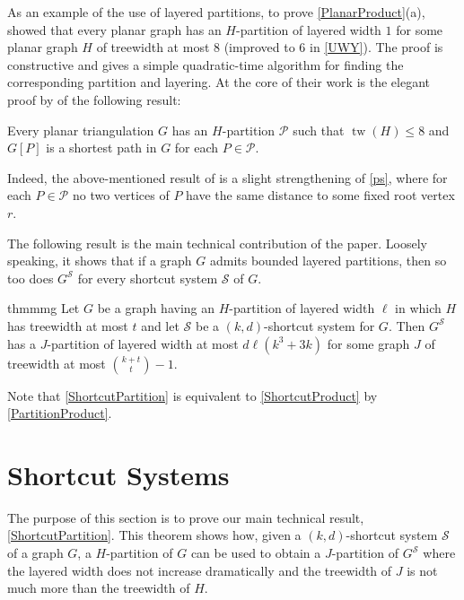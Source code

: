 \documentclass{patmorin}
\DeclareMathOperator{\tw}{tw}
\newcommand{\PP}{\mathcal{P}}
\renewcommand{\SS}{\mathcal{S}}
\renewcommand{\leq}{\leqslant}
\begin{document}
As an example of the use of layered partitions, to prove \cref{PlanarProduct}(a),
\citet{DJMMUW20} showed that every planar graph has an $H$-partition of layered width $1$ for some planar graph $H$ of treewidth at most $8$ (improved to $6$ in \cref{UWY}). The proof is constructive and gives a simple quadratic-time algorithm for finding the corresponding partition and layering. At the core of their work is the elegant proof by \citet{PS21} of the following result:

\begin{thm}[\citep{PS21}]
\label{ps}
Every planar triangulation $G$ has an $H$-partition $\PP$
such that $\tw(H)\leq 8$ and $G[P]$ is a shortest path in $G$ for each $P\in\PP$.
\end{thm}

Indeed, the above-mentioned result of \citet{DJMMUW20} is a slight strengthening of \cref{ps}, where for each $P\in\PP$ no two vertices of $P$ have the same distance to some fixed root vertex $r$.

The following result is the main technical contribution of the paper. Loosely speaking, it shows that if a graph $G$ admits bounded layered partitions, then so too does $G^\SS$ for every shortcut system $\SS$ of $G$.

\begin{restatable}{thm}{mmg}
	\label{ShortcutPartition}
	Let $G$ be a graph having an $H$-partition of layered width $\ell$ in which $H$ has treewidth at most $t$ and let $\SS$ be a $(k,d)$-shortcut system for $G$.  Then $G^\SS$ has a $J$-partition of layered width at most $d\ell(k^3+3k)$ for some graph $J$ of treewidth at most $\binom{k+t}{t}-1$.
\end{restatable}

Note that \cref{ShortcutPartition} is equivalent to \cref{ShortcutProduct} by \cref{PartitionProduct}.



\section{Shortcut Systems}
\label{Structure}

The purpose of this section is to prove our main technical result, \cref{ShortcutPartition}. This theorem shows how, given a $(k,d)$-shortcut system $\SS$ of a graph $G$, a $H$-partition of $G$ can be used to obtain a $J$-partition of $G^{\SS}$ where the layered width  does not increase dramatically and the treewidth of $J$ is not much more than the treewidth of $H$.
\end{document}

